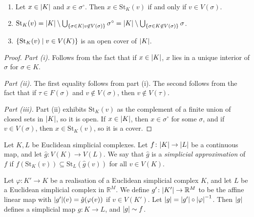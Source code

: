 \begin{lemma}
	\begin{enumerate}
		\item Let \( x \in \abs{K} \) and \( x \in \sigma^\circ \).
			Then \( x \in \mathrm{St}_K(v) \) if and only if \( v \in V(\sigma) \).
		\item \( \mathrm{St}_K(v) = \abs{K} \setminus \bigcup_{\qty{\sigma \in K \mid v \not\in V(\sigma)}} \sigma^\circ = \abs{K} \setminus \bigcup_{\qty{\sigma \in K \not\in V(\sigma)}} \sigma \).
		\item \( \qty{\mathrm{St}_K(v) \mid v \in V(K)} \) is an open cover of \( \abs{K} \).
	\end{enumerate}
\end{lemma}
\begin{proof}
	\emph{Part (i).}
	Follows from the fact that if \( x \in \abs{K} \), \( x \) lies in a unique interior of \( \sigma \) for \( \sigma \in K \).

	\emph{Part (ii).}
	The first equality follows from part (i).
	The second follows from the fact that if \( \tau \in F(\sigma) \) and \( v \not\in V(\sigma) \), then \( v \not\in V(\tau) \).

	\emph{Part (iii).}
	Part (ii) exhibits \( \mathrm{St}_K(v) \) as the complement of a finite union of closed sets in \( \abs{K} \), so it is open.
	If \( x \in \abs{K} \), then \( x \in \sigma^\circ \) for some \( \sigma \), and if \( v \in V(\sigma) \), then \( x \in \mathrm{St}_K(v) \), so it is a cover.
\end{proof}
\begin{definition}
	Let \( K, L \) be Euclidean simplicial complexes.
	Let \( f \colon \abs{K} \to \abs{L} \) be a continuous map, and let \( \hat g \colon V(K) \to V(L) \).
	We say that \( \hat g \) is a \emph{simplicial approximation} of \( f \) if \( f(\mathrm{St}_K(v)) \subseteq \mathrm{St}_L(\hat g(v)) \) for all \( v \in V(K) \).
\end{definition}
\begin{theorem}
	Let \( \varphi \colon K' \to K \) be a realisation of a Euclidean simplicial complex \( K \), and let \( L \) be a Euclidean simplicial complex in \( \mathbb R^M \).
	We define \( g' \colon \abs{K'} \to \mathbb R^M \) to be the affine linear map with \( \abs{g'}(v) = \hat g(\varphi(v)) \) if \( v \in V(K') \).
	Let \( \abs{g} = \abs{g'} \circ \abs{\varphi}^{-1} \).
	Then \( \abs{g} \) defines a simplicial map \( g \colon K \to L \), and \( \abs{g} \sim f \).
\end{theorem}
